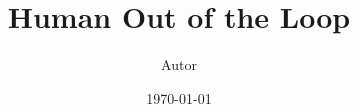 \usepackage[utf8]{inputenc}
\usepackage[spanish]{babel}
\usepackage{amsmath, amssymb}
\usepackage{hyperref}
\usepackage{geometry}
\geometry{a4paper, margin=2.5cm}
\title{Human Out of the Loop}
\author{Autor}
\date{\today}
